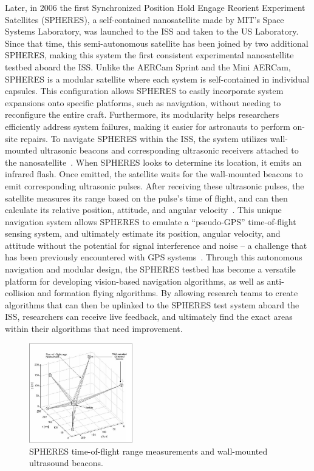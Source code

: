 \documentclass[journal, 10pt]{IEEEtran}
\begin{document}
Later, in 2006 the first Synchronized Position Hold Engage Reorient Experiment Satellites (SPHERES), a self-contained nanosatellite made by MIT's Space Systems Laboratory, was launched to the ISS and taken to the US Laboratory. Since that time, this semi-autonomous satellite has been joined by two additional SPHERES, making this system the first consistent experimental nanosatellite testbed aboard the ISS. Unlike the AERCam Sprint and the Mini AERCam, SPHERES is a modular satellite where each system is self-contained in individual capsules. This configuration allows SPHERES to easily incorporate system expansions onto specific platforms, such as navigation, without needing to reconfigure the entire craft. Furthermore, its modularity helps researchers efficiently address system failures, making it easier for astronauts to perform on-site repairs. To navigate SPHERES within the ISS, the system utilizes wall-mounted ultrasonic beacons and corresponding ultrasonic receivers attached to the nanosatellite~\cite{SPHERES}. When SPHERES looks to determine its location, it emits an infrared flash. Once emitted, the satellite waits for the wall-mounted beacons to emit corresponding ultrasonic pulses. After receiving these ultrasonic pulses, the satellite measures its range based on the pulse's time of flight, and can then calculate its relative position, attitude, and angular velocity~\cite{SPHERES, Vertigo1}. This unique navigation system allows SPHERES to emulate a ``pseudo-GPS'' time-of-flight sensing system, and ultimately estimate its position, angular velocity, and attitude without the potential for signal interference and noise -- a challenge that has been previously encountered with GPS systems~\cite{Vertigo1}. Through this autonomous navigation and modular design, the SPHERES testbed has become a versatile platform for developing vision-based navigation algorithms, as well as anti-collision and formation flying algorithms. By allowing research teams to create algorithms that can then be uplinked to the SPHERES test system aboard the ISS, researchers can receive live feedback, and ultimately find the exact areas within their algorithms that need improvement.

\begin{figure}[tb]
\begin{center}
\includegraphics[width=0.4\textwidth]{figures/Spheres_Auto10.pdf}
\caption{SPHERES time-of-flight range measurements and wall-mounted ultrasound beacons.}
\label{spheres_plot}
\end{center}
\end{figure}
\end{document}
